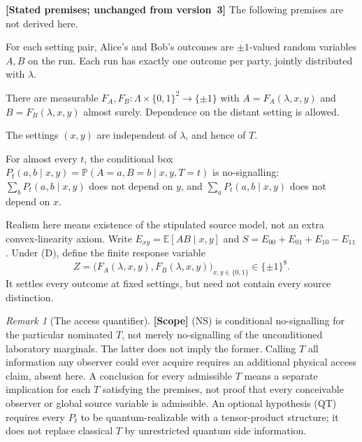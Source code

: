 \documentclass[11pt,a4paper]{article}
\theoremstyle{definition}
\theoremstyle{remark}\newtheorem{remark}[theorem]{Remark}
\newcommand{\status}[1]{\textbf{[#1]}\quad}
\newcommand{\Prb}{\mathbb P}
\newcommand{\E}{\mathbb E}
\begin{document}
\status{Stated premises; unchanged from version~3}
The following premises are not derived here.
\begin{description}[leftmargin=2.2em,style=nextline]
\item[(SO) Single outcomes.] For each setting pair, Alice's and Bob's outcomes are $\pm1$-valued random variables $A,B$ on the run. Each run has exactly one outcome per party, jointly distributed with $\lambda$.
\item[(D) Determinism.] There are measurable $F_A,F_B:\Lambda\times\{0,1\}^2\to\{\pm1\}$ with $A=F_A(\lambda,x,y)$ and $B=F_B(\lambda,x,y)$ almost surely. Dependence on the distant setting is allowed.
\item[(MI) Measurement independence.] The settings $(x,y)$ are independent of $\lambda$, and hence of $T$.
\item[(NS) Tier-1 no-signalling.] For almost every $t$, the conditional box $P_t(a,b\mid x,y)=\Prb(A=a,B=b\mid x,y,T=t)$ is no-signalling: $\sum_bP_t(a,b\mid x,y)$ does not depend on $y$, and $\sum_aP_t(a,b\mid x,y)$ does not depend on $x$.
\end{description}
Realism here means existence of the stipulated source model, not an extra convex-linearity axiom. Write $E_{xy}=\E[AB\mid x,y]$ and $S=E_{00}+E_{01}+E_{10}-E_{11}$. Under (D), define the finite response variable
\[
 Z=\bigl(F_A(\lambda,x,y),F_B(\lambda,x,y)\bigr)_{x,y\in\{0,1\}}
 \in\{\pm1\}^8.
\]
It settles every outcome at fixed settings, but need not contain every source distinction.

\begin{remark}[The access quantifier]\label{tet:access}
\status{Scope}
(NS) is conditional no-signalling for the particular nominated $T$, not merely no-signalling of the unconditioned laboratory marginals. The latter does not imply the former. Calling $T$ all information any observer could ever acquire requires an additional physical access claim, absent here. A conclusion for every admissible $T$ means a separate implication for each $T$ satisfying the premises, not proof that every conceivable observer or global source variable is admissible. An optional hypothesis (QT) requires every $P_t$ to be quantum-realizable with a tensor-product structure; it does not replace classical $T$ by unrestricted quantum side information.
\end{remark}
\end{document}
